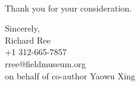 \documentclass[11pt]{letter}
\begin{document}
\begin{letter}{ \\

}
\begin{enumerate}
\end{enumerate}

Thank you for your consideration.


\closing{Sincerely,\\
  \bigskip
  Richard Ree\\
  +1 312-665-7857\\
  rree@fieldmuseum.org\\
  \medskip on behalf of co-author Yaowu Xing
  }


\end{letter}
\end{document}
